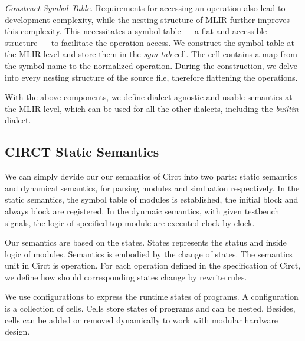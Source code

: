 \smallskip
\textit{Construct Symbol Table}. Requirements for accessing an operation also lead to development complexity, while the nesting structure of MLIR further improves this complexity. This necessitates a symbol table --- a flat and accessible structure --- to facilitate the operation access. We construct the symbol table at the MLIR level and store them in the \textit{sym-tab} cell. The cell contains a map from the symbol name to the normalized operation. During the construction, we delve into every nesting structure of the source file, therefore flattening the operations.

 With the above components, we define dialect-agnostic and usable semantics at the MLIR level, which can be used for all the other dialects, including the \textit{builtin} dialect.

\subsection{CIRCT Static Semantics}\label{sec:circt-static-semantics}


We can simply devide our our semantics of Circt into two parts: static semantics and dynamical semantics, for parsing modules and simluation respectively. In the static semantics, the symbol table of modules is established, the initial block and always block are registered. In the dynmaic semantics, with given testbench signals, the logic of specified top module are executed clock by clock.

Our semantics are based on the states. States represents the status and inside logic of modules. Semantics is embodied by the change of states. The semantics unit in Circt is operation. For each operation defined in the specification of Circt, we define how should corresponding states change by rewrite rules.

We use configurations to express the runtime states of programs. A configuration is a collection of cells. Cells store states of programs and can be nested. Besides, cells can be added or removed dynamically to work with modular hardware design.


